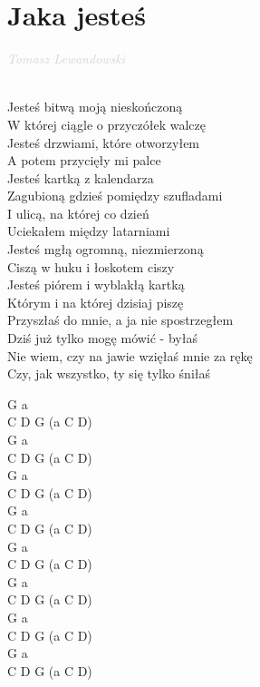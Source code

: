 \documentclass[a5paper, 10pt]{book}
\begin{document}
\newpage
\section{Jaka jesteś}\textcolor{lightgray}{\textit{Tomasz Lewandowski}}\\~\\
\begin{minipage}[t]{0.7\textwidth}
  Jesteś bitwą moją nieskończoną\\
  W której ciągle o przyczółek walczę\\
  Jesteś drzwiami, które otworzyłem\\
  A potem przycięły mi palce\\

  \hspace*{5mm} Jesteś kartką z kalendarza\\
  \hspace*{5mm} Zagubioną gdzieś pomiędzy szufladami\\
  \hspace*{5mm} I ulicą, na której co dzień\\
  \hspace*{5mm} Uciekałem między latarniami\\

  Jesteś mgłą ogromną, niezmierzoną\\
  Ciszą w huku i łoskotem ciszy\\
  Jesteś piórem i wyblakłą kartką\\
  Którym i na której dzisiaj piszę\\

  Przyszłaś do mnie, a ja nie spostrzegłem\\
  Dziś już tylko mogę mówić - byłaś\\
  Nie wiem, czy na jawie wzięłaś mnie za rękę\\
  Czy, jak wszystko, ty się tylko śniłaś\\

\end{minipage}
\begin{minipage}[t]{0.3\textwidth}
  G a\\
  C D G (a C D) \\
  G a\\
  C D G (a C D) \\

  G a\\
  C D G (a C D) \\
  G a\\
  C D G (a C D) \\

  G a\\
  C D G (a C D) \\
  G a\\
  C D G (a C D) \\

  G a\\
  C D G (a C D) \\
  G a\\
  C D G (a C D) \\

\end{minipage}
\end{document}
